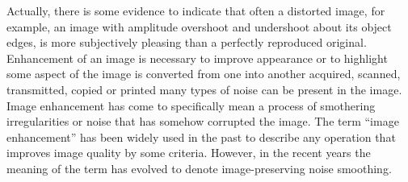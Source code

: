 Actually, there is some evidence to indicate that often a distorted image, for example, an image with amplitude overshoot and undershoot about its object edges, is more subjectively pleasing than a perfectly reproduced original\cite{ie2}. Enhancement of an image is necessary to improve appearance or to highlight some aspect of the image is converted from one into another acquired, scanned, transmitted, copied or printed many types of noise can be present in the image. Image enhancement has come to specifically mean a process of smothering irregularities or noise that has somehow corrupted the image. The term “image enhancement” has been widely used in the past to describe any operation that improves image quality by some criteria. However, in the recent years the meaning of the term has evolved to denote image-preserving noise smoothing\cite{lime}.

